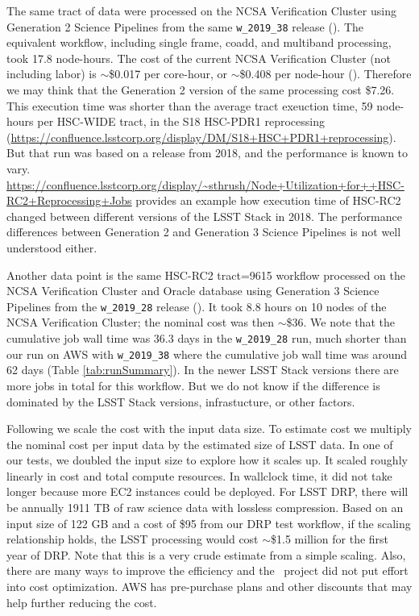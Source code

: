 The same tract of data were processed on the NCSA Verification Cluster using Generation 2 Science Pipelines from the same \texttt{w\_2019\_38} release ().
The equivalent workflow, including single frame, coadd, and multiband processing, took 17.8 node-hours.
The cost of the current NCSA Verification Cluster (not including labor) is $\sim$\$0.017 per core-hour, or $\sim$\$0.408 per node-hour ().
Therefore we may think that the Generation 2 version of the same processing cost \$7.26.
This execution time was shorter than the average tract exeuction time, 59 node-hours per HSC-WIDE tract, in the S18 HSC-PDR1 reprocessing (\url{https://confluence.lsstcorp.org/display/DM/S18+HSC+PDR1+reprocessing}).
But that run was based on a release from 2018, and the performance is known to vary.
\url{https://confluence.lsstcorp.org/display/~sthrush/Node+Utilization+for++HSC-RC2+Reprocessing+Jobs} provides an example how execution time of HSC-RC2 changed between different versions of the LSST Stack in 2018.
The performance differences between Generation 2 and Generation 3 Science Pipelines is not well understood either.

Another data point is the same HSC-RC2 tract=9615 workflow processed on the NCSA Verification Cluster and Oracle database using Generation 3 Science Pipelines from the \texttt{w\_2019\_28} release ().
It took 8.8 hours on 10 nodes of the NCSA Verification Cluster; the nominal cost was then $\sim$\$36.
We note that the cumulative job wall time was 36.3 days in the \texttt{w\_2019\_28} run, much shorter than our run on AWS with \texttt{w\_2019\_38} where the cumulative job wall time was around 62 days (Table \ref{tab:runSummary}).
In the newer LSST Stack versions there are more jobs in total for this workflow.
But we do not know if the difference is dominated by the LSST Stack versions, infrastucture, or other factors.

Following  we scale the cost with the input data size.
To estimate cost we multiply the nominal cost per input data by the estimated size of LSST data.
In one of our tests, we doubled the input size to explore how it scales up.
It scaled roughly linearly in cost and total compute resources.
In wallclock time, it did not take longer because more EC2 instances could be deployed.
For LSST DRP, there will be annually 1911 TB of raw science data with lossless compression.
Based on an input size of 122 GB and a cost of \$95 from our DRP test workflow, if the scaling relationship holds, the LSST processing would cost $\sim$\$1.5 million for the first year of DRP.
Note that this is a very crude estimate from a simple scaling.
Also, there are many ways to improve the efficiency and the \poc~project did not put effort into cost optimization.
AWS has pre-purchase plans and other discounts that may help further reducing the cost.


